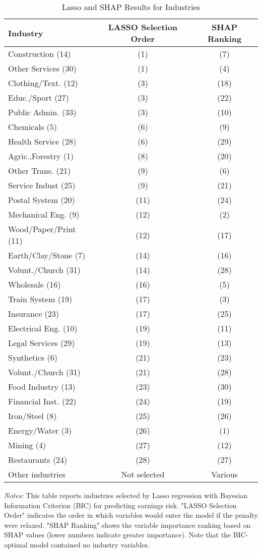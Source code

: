 \documentclass[12pt]{article}
\begin{document}
\begin{table}[ht]
\centering
\caption{Lasso and SHAP Results for Industries}

\begin{tabular}{lcc}

\toprule
Industry & LASSO Selection Order & SHAP Ranking \\
\midrule
Construction (14) & (1) & (7) \\
Other Services (30) & (1) & (4) \\
Clothing/Text. (12) & (3) & (18) \\
Educ./Sport (27) & (3) & (22) \\
Public Admin. (33) & (3) & (10) \\
Chemicals (5) & (6) & (9) \\
Health Service (28) & (6) & (29) \\
Agric.,Forestry (1) & (8) & (20) \\
Other Trans. (21) & (9) & (6) \\
Service Indust (25) & (9) & (21) \\
Postal System (20) & (11) & (24) \\
Mechanical Eng. (9) & (12) & (2) \\
Wood/Paper/Print (11) & (12) & (17) \\
Earth/Clay/Stone (7) & (14) & (16) \\
Volunt./Church (31) & (14) & (28) \\
Wholesale (16) & (16) & (5) \\
Train System (19) & (17) & (3) \\
Insurance (23) & (17) & (25) \\
Electrical Eng. (10) & (19) & (11) \\
Legal Services (29) & (19) & (13) \\
Synthetics (6) & (21) & (23) \\
Volunt./Church (31) & (21) & (28) \\
Food Industry (13) & (23) & (30) \\
Financial Inst. (22) & (24) & (19) \\
Iron/Steel (8) & (25) & (26) \\
Energy/Water (3) & (26) & (1) \\
Mining (4) & (27) & (12) \\
Restaurants (24) & (28) & (27) \\
Other industries & Not selected & Various \\
\bottomrule
\end{tabular}%
\newline

\footnotesize
\textit{Notes:} This table reports industries selected by Lasso regression with Bayesian Information Criterion (BIC) for predicting earnings risk. "LASSO Selection Order" indicates the order in which variables would enter the model if the penalty were relaxed. "SHAP Ranking" shows the variable importance ranking based on SHAP values (lower numbers indicate greater importance). Note that the BIC-optimal model contained no industry variables.

\end{table}










\end{document}
